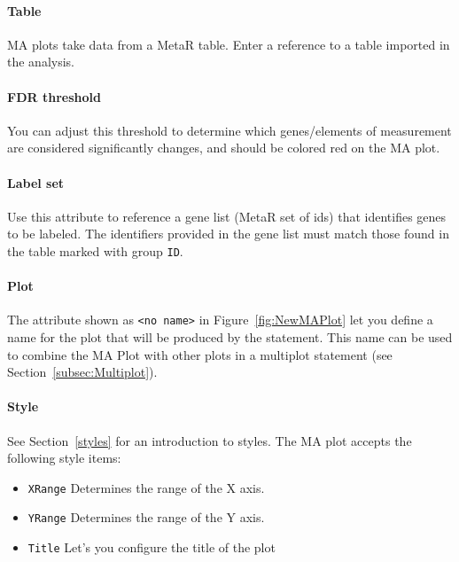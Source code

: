 \paragraph{Table}
 MA plots take data from a MetaR table. Enter a reference to a table imported in the analysis.
\paragraph{FDR threshold}
You can adjust this threshold to determine which genes/elements of measurement are considered significantly changes, and should be colored red on the MA plot. 

\paragraph{Label set}
Use this attribute to reference a gene list (MetaR set of ids) that identifies genes to be labeled. The identifiers provided in the gene list must match those found in the table marked with group \texttt{ID}.
\paragraph{Plot}
The attribute shown as \texttt{<no name>} in Figure~\ref{fig:NewMAPlot} let you define a name for the plot that will be produced by the statement. This name can be used to combine the MA Plot with other plots in a multiplot statement (see Section~\ref{subsec:Multiplot}).

\paragraph{Style}
See Section~\ref{styles} for an introduction to styles.
The MA plot accepts the following style items:

\begin{itemize}
  \item \texttt{XRange} Determines the range of the X axis.
  \item \texttt{YRange} Determines the range of the Y axis.
  \item \texttt{Title} Let's you configure the title of the plot
\end{itemize}

